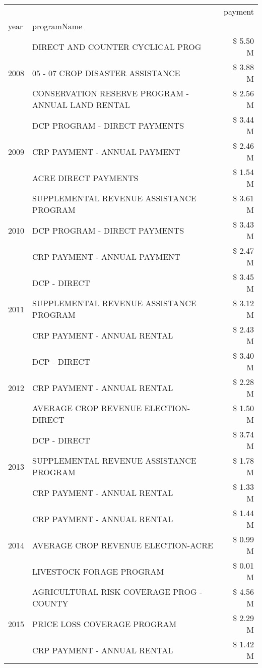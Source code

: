 \begin{tabular}{llr}
\toprule
 &  & payment \\
year & programName &  \\
\midrule
\multirow[t]{3}{*}{2008} & DIRECT AND COUNTER CYCLICAL PROG & \$ 5.50 M \\
 & 05 - 07 CROP DISASTER ASSISTANCE & \$ 3.88 M \\
 & CONSERVATION RESERVE PROGRAM - ANNUAL LAND RENTAL & \$ 2.56 M \\
\cline{1-3}
\multirow[t]{3}{*}{2009} & DCP PROGRAM - DIRECT PAYMENTS & \$ 3.44 M \\
 & CRP PAYMENT - ANNUAL PAYMENT & \$ 2.46 M \\
 & ACRE DIRECT PAYMENTS & \$ 1.54 M \\
\cline{1-3}
\multirow[t]{3}{*}{2010} & SUPPLEMENTAL REVENUE ASSISTANCE PROGRAM & \$ 3.61 M \\
 & DCP PROGRAM - DIRECT PAYMENTS & \$ 3.43 M \\
 & CRP PAYMENT - ANNUAL PAYMENT & \$ 2.47 M \\
\cline{1-3}
\multirow[t]{3}{*}{2011} & DCP - DIRECT & \$ 3.45 M \\
 & SUPPLEMENTAL REVENUE ASSISTANCE PROGRAM & \$ 3.12 M \\
 & CRP PAYMENT - ANNUAL RENTAL & \$ 2.43 M \\
\cline{1-3}
\multirow[t]{3}{*}{2012} & DCP - DIRECT & \$ 3.40 M \\
 & CRP PAYMENT - ANNUAL RENTAL & \$ 2.28 M \\
 & AVERAGE CROP REVENUE ELECTION-DIRECT & \$ 1.50 M \\
\cline{1-3}
\multirow[t]{3}{*}{2013} & DCP - DIRECT & \$ 3.74 M \\
 & SUPPLEMENTAL REVENUE ASSISTANCE PROGRAM & \$ 1.78 M \\
 & CRP PAYMENT - ANNUAL RENTAL & \$ 1.33 M \\
\cline{1-3}
\multirow[t]{3}{*}{2014} & CRP PAYMENT - ANNUAL RENTAL & \$ 1.44 M \\
 & AVERAGE CROP REVENUE ELECTION-ACRE & \$ 0.99 M \\
 & LIVESTOCK FORAGE PROGRAM & \$ 0.01 M \\
\cline{1-3}
\multirow[t]{3}{*}{2015} & AGRICULTURAL RISK COVERAGE PROG - COUNTY & \$ 4.56 M \\
 & PRICE LOSS COVERAGE PROGRAM & \$ 2.29 M \\
 & CRP PAYMENT - ANNUAL RENTAL & \$ 1.42 M \\
\cline{1-3}

\end{tabular}
